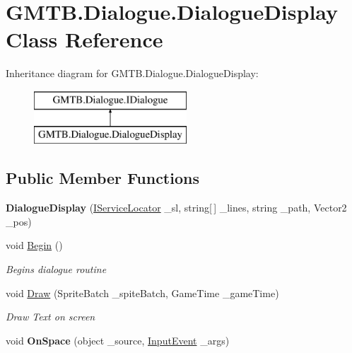 \hypertarget{class_g_m_t_b_1_1_dialogue_1_1_dialogue_display}{}\section{G\+M\+T\+B.\+Dialogue.\+Dialogue\+Display Class Reference}
\label{class_g_m_t_b_1_1_dialogue_1_1_dialogue_display}
Inheritance diagram for G\+M\+T\+B.\+Dialogue.\+Dialogue\+Display\+:\begin{figure}[H]
\begin{center}
\leavevmode
\includegraphics[height=2.000000cm]{class_g_m_t_b_1_1_dialogue_1_1_dialogue_display}
\end{center}
\end{figure}
\subsection*{Public Member Functions}
\begin{DoxyCompactItemize}
\item 
\mbox{\label{class_g_m_t_b_1_1_dialogue_1_1_dialogue_display_a19ca9573e11a4d5264129d2157848c3f}} 
{\bfseries Dialogue\+Display} (\mbox{\hyperlink{interface_g_m_t_b_1_1_interfaces_1_1_i_service_locator}{I\+Service\+Locator}} \+\_\+sl, string\mbox{[}$\,$\mbox{]} \+\_\+lines, string \+\_\+path, Vector2 \+\_\+pos)
\item 
void \mbox{\hyperlink{class_g_m_t_b_1_1_dialogue_1_1_dialogue_display_ab9d872cd5375b06f774391852a952a99}{Begin}} ()
\begin{DoxyCompactList}\small\item\em Begins dialogue routine \end{DoxyCompactList}\item 
void \mbox{\hyperlink{class_g_m_t_b_1_1_dialogue_1_1_dialogue_display_aaab0714aa95f8c01b1b4f817547bfcd1}{Draw}} (Sprite\+Batch \+\_\+spite\+Batch, Game\+Time \+\_\+game\+Time)
\begin{DoxyCompactList}\small\item\em Draw Text on screen \end{DoxyCompactList}\item 
\mbox{\label{class_g_m_t_b_1_1_dialogue_1_1_dialogue_display_a1a70444522aa638571b50544599b1692}} 
void {\bfseries On\+Space} (object \+\_\+source, \mbox{\hyperlink{class_g_m_t_b_1_1_input_system_1_1_input_event}{Input\+Event}} \+\_\+args)
\end{DoxyCompactItemize}


